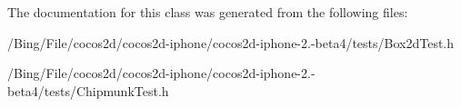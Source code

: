 The documentation for this class was generated from the following files\-:\begin{DoxyCompactItemize}
\item 
/\-Bing/\-File/cocos2d/cocos2d-\/iphone/cocos2d-\/iphone-\/2.-\/beta4/tests/Box2d\-Test.\-h\item 
/\-Bing/\-File/cocos2d/cocos2d-\/iphone/cocos2d-\/iphone-\/2.-\/beta4/tests/Chipmunk\-Test.\-h\end{DoxyCompactItemize}
